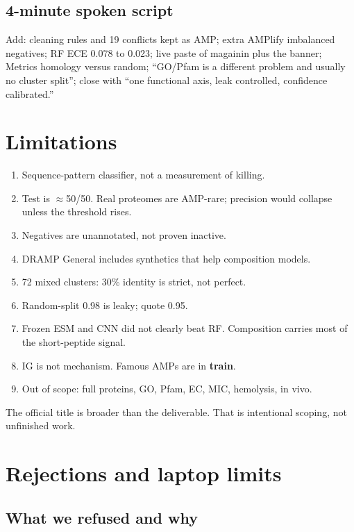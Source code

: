 \documentclass[11pt,a4paper]{report}
\begin{document}
\section{4-minute spoken script}

Add: cleaning rules and 19 conflicts kept as AMP; extra AMPlify imbalanced negatives; RF ECE 0.078 to 0.023; live paste of magainin plus the banner; Metrics homology versus random; ``GO/Pfam is a different problem and usually no cluster split''; close with ``one functional axis, leak controlled, confidence calibrated.''

\chapter{Limitations}
\label{ch:lim}

\begin{enumerate}
\item Sequence-pattern classifier, not a measurement of killing.
\item Test is $\approx$50/50. Real proteomes are AMP-rare; precision would collapse unless the threshold rises.
\item Negatives are unannotated, not proven inactive.
\item DRAMP General includes synthetics that help composition models.
\item 72 mixed clusters: 30\% identity is strict, not perfect.
\item Random-split 0.98 is leaky; quote 0.95.
\item Frozen ESM and CNN did not clearly beat RF. Composition carries most of the short-peptide signal.
\item IG is not mechanism. Famous AMPs are in \textbf{train}.
\item Out of scope: full proteins, GO, Pfam, EC, MIC, hemolysis, in vivo.
\end{enumerate}

The official title is broader than the deliverable. That is intentional scoping, not unfinished work.

\chapter{Rejections and laptop limits}
\label{ch:reject}

\section{What we refused and why}
\end{document}
